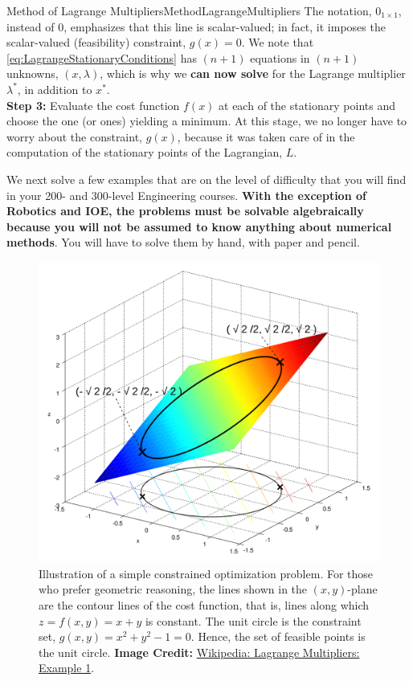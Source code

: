 \begin{methodColor}{Method of Lagrange Multipliers}{MethodLagrangeMultipliers}
The notation, $0_{1 \times 1}$, instead of $0$, emphasizes that this line is scalar-valued; in fact, it imposes the scalar-valued (feasibility) constraint, $g(x) = 0$. We note that \eqref{eq:LagrangeStationaryConditions} has $(n+1)$ equations in $(n+1)$ unknowns, $(x, \lambda)$, which is why we \textbf{can now solve} for the Lagrange multiplier $\lambda^\ast$, in addition to $x^\ast$.\\

\textbf{Step 3:} Evaluate the cost function $f(x)$ at each of the stationary points and choose the one (or ones) yielding a minimum. At this stage, we no longer have to worry about the constraint, $g(x)$, because it was taken care of in the computation of the stationary points of the Lagrangian, $L$.  

\end{methodColor}

\bigskip

We next solve a few examples that are on the level of difficulty that you will find in your 200- and 300-level Engineering courses. \textbf{With the exception of Robotics and IOE, the problems must be solvable algebraically because you will not be assumed to know anything about numerical methods}. You will have to solve them by hand, with paper and pencil.

\begin{figure}[ht]
    \centering
    \includegraphics[width=0.7\columnwidth]{graphics/Chap06/Lagrange_very_simple.svg.png}
    \caption{Illustration of a simple constrained optimization problem. For those who prefer geometric reasoning, the lines shown in the $(x,y)$-plane are the contour lines of the cost function, that is, lines along which $z = f(x, y)= x + y$ is constant. The unit circle is the constraint set, $g(x, y) = x^2 + y^2 - 1 = 0$. Hence, the set of feasible points is the unit circle. {\bf Image Credit:} \href{https://en.wikipedia.org/wiki/Lagrange\_multiplier\#\~:text=\%5Bedit\%5D-,Example\%201,-\%5Bedit\%5D}{Wikipedia: Lagrange Multipliers: Example 1}.}
    \label{ig:SimpleLagrangeMultiplier}
\end{figure}

